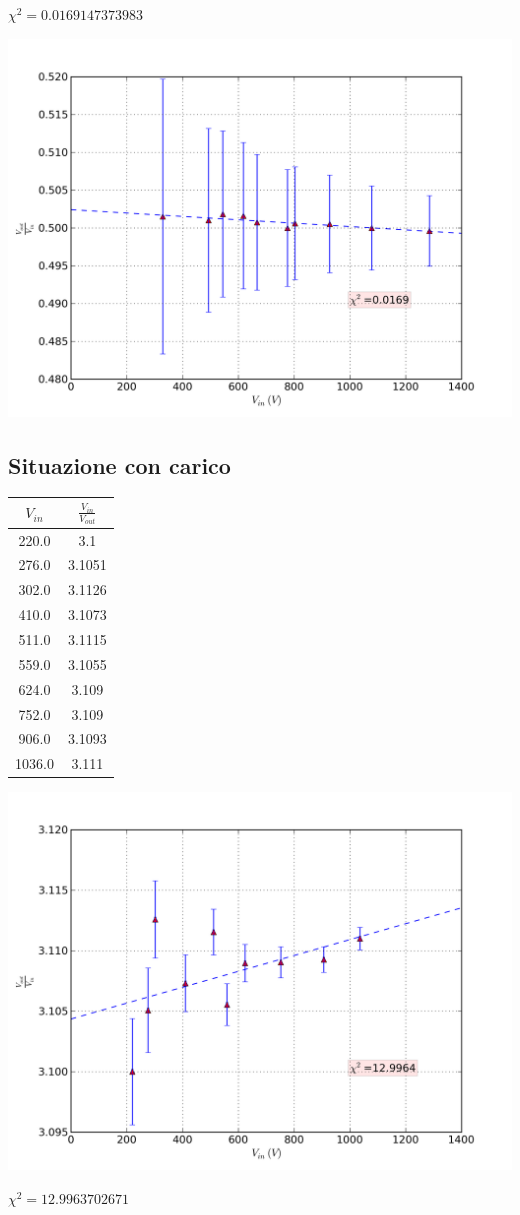 $\chi^2=0.0169147373983$


\includegraphics[scale=0.75]{grafici/C1/part1.png}

\subsection{Situazione con carico}
\begin{center}

\begin{tabular}{*{2}{c}}
$V_{in}$ & $\frac{V_{in}}{V_{out}}$\\
\midrule
220.0 & 3.1 \\
276.0 & 3.1051 \\
302.0 & 3.1126 \\
410.0 & 3.1073 \\
511.0 & 3.1115 \\
559.0 & 3.1055 \\
624.0 & 3.109 \\
752.0 & 3.109 \\
906.0 & 3.1093 \\
1036.0 & 3.111 \\
\end{tabular}

\end{center}
\includegraphics[scale=0.75]{grafici/C1/part2.png}

$\chi^2 = 12.9963702671$

